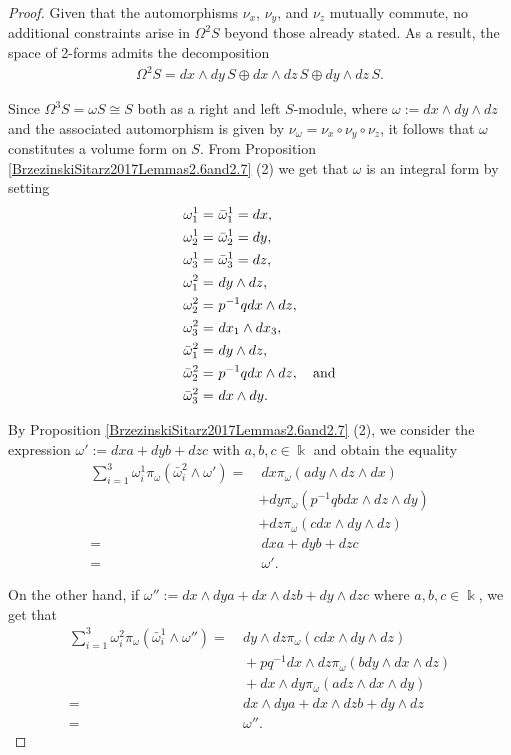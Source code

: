 \documentclass{amsart}
\theoremstyle{definition}
\theoremstyle{remark}
\numberwithin{equation}{section}
\begin{document}
\begin{proof}
Given that the automorphisms $\nu_x$, $\nu_y$, and $\nu_z$ mutually commute, no additional constraints arise in $\Omega^2 S$ beyond those already stated. As a result, the space of 2-forms admits the decomposition
\begin{align*}
\Omega^2 S = dx \wedge dy\, S \oplus dx \wedge dz\, S \oplus dy \wedge dz\, S.
\end{align*}


Since $\Omega^3 S = \omega S \cong S$ both as a right and left $S$-module, where $\omega := dx \wedge dy \wedge dz$ and the associated automorphism is given by $\nu_{\omega} = \nu_{x} \circ \nu_{y} \circ \nu_{z}$, it follows that $\omega$ constitutes a volume form on $S$.
 From Proposition \ref{BrzezinskiSitarz2017Lemmas2.6and2.7} (2) we get that $\omega$ is an integral form by setting
\begin{align*}
\omega_1^1  = &\ \bar{\omega}_1^1 = dx, \\  
\omega_2^1 = &\ \bar{\omega}_2^1 = dy, \\
\omega_3^1 = &\ \bar{\omega}_3^1 = dz, \\
    \omega_1^2 = &\ dy\wedge dz, \\
    \omega_2^2 = &\ p^{-1}qdx\wedge dz, \\ 
    \omega_3^2 = &\ dx_1\wedge dx_3, \\
    \bar{\omega}_1^2 = &\ dy\wedge dz, \\
    \bar{\omega}_2^2 = &\ p^{-1}qdx\wedge dz, \quad {\rm and} \\ 
    \bar{\omega}_3^2 = &\ dx\wedge dy.
\end{align*}

By Proposition \ref{BrzezinskiSitarz2017Lemmas2.6and2.7} (2), we consider the expression $\omega' := dxa + dyb + dzc$ with $a, b, c \in \Bbbk$ and obtain the equality
\begin{align*}
    \sum_{i=1}^{3}\omega_{i}^{1}\pi_{\omega}(\bar{\omega}_i^{2}\wedge \omega') = &\ dx\pi_{\omega}(ady\wedge dz\wedge dx) \\
    & + dy\pi_{\omega}(p^{-1}qbdx\wedge dz\wedge dy) \\
    & + dz\pi_{\omega}(cdx\wedge dy\wedge dz) \\
    = &\ dxa+dyb+dzc \\
    = &\ \omega'.
\end{align*}

On the other hand, if $\omega'' := dx\wedge dya+dx\wedge dz b+dy\wedge dz c$ where $a,b,c \in \Bbbk$, we get that
\begin{align*}
\sum_{i=1}^{3}\omega_{i}^{2}\pi_{\omega}(\bar{\omega}_i^{1}\wedge \omega'') = &\  dy\wedge dz\pi_{\omega}(cdx\wedge dy \wedge dz) \\
&\ +pq^{-1}dx\wedge dz\pi_{\omega}(bdy\wedge dx\wedge dz) \\
    &\ + dx\wedge dy\pi_{\omega}(adz \wedge dx \wedge dy) \\ 
    = &\ dx\wedge dya+dx\wedge dzb+dy\wedge dz \\
    = &\ \omega''.
\end{align*}


\end{proof}
\end{document}
